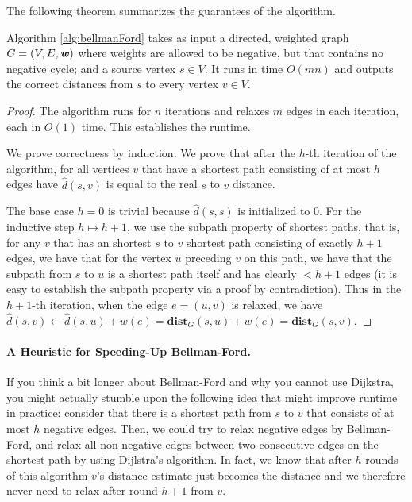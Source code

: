 The following theorem summarizes the guarantees of the algorithm.

\begin{theorem}
Algorithm \ref{alg:bellmanFord} takes as input a directed, weighted graph $G=(V,E, \boldsymbol{\mathit{w}})$ where weights are allowed to be negative, but that contains no negative cycle; and a source vertex $s \in V$. It runs in time $O(mn)$ and outputs the correct distances from $s$ to every vertex $v \in V$. 
\end{theorem}
\begin{proof}
The algorithm runs for $n$ iterations and relaxes $m$ edges in each iteration, each in $O(1)$ time. This establishes the runtime.

We prove correctness by induction. We prove that after the $h$-th iteration of the algorithm, for all vertices $v$ that have a shortest path consisting of at most $h$ edges have $\hat{d}(s,v)$ is equal to the real $s$ to $v$ distance.

The base case $h = 0$ is trivial because $\hat{d}(s,s)$ is initialized to $0$. For the inductive step $h \mapsto h+1$, we use the subpath property of shortest paths, that is, for any $v$ that has an shortest $s$ to $v$ shortest path consisting of exactly $h+1$ edges, we have that for the vertex $u$ preceding $v$ on this path, we have that the subpath from $s$ to $u$ is a shortest path itself and has clearly $<h+1$ edges (it is easy to establish the subpath property via a proof by contradiction). Thus in the $h+1$-th iteration, when the edge $e = (u,v)$ is relaxed, we have $\hat{d}(s, v) \gets \hat{d}(s, u) + w(e)= \mathbf{dist}_G(s,u) + w(e) = \mathbf{dist}_G(s,v)$.
\end{proof}

\paragraph{A Heuristic for Speeding-Up Bellman-Ford.} If you think a bit longer about Bellman-Ford and why you cannot use Dijkstra, you might actually stumble upon the following idea that might improve runtime in practice: consider that there is a shortest path from $s$ to $v$ that consists of at most $h$ negative edges. Then, we could try to relax negative edges by Bellman-Ford, and relax all non-negative edges between two consecutive edges on the shortest path by using Dijlstra's algorithm.  In fact, we know that after $h$ rounds of this algorithm $v$'s distance estimate just becomes the distance and we therefore never need to relax after round $h+1$ from $v$. 

